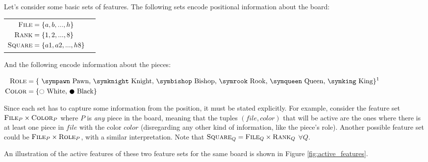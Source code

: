 Let's consider some basic sets of features. The following sets encode positional information about the board:

\begin{center}
\begin{tabular}{cc}

$\begin{aligned}[t]
\textsc{File} &= \{a, b, ..., h\} \\
\textsc{Rank} &= \{1, 2, ..., 8\} \\
\textsc{Square} &= \{a1, a2, ..., h8\}
\end{aligned}$

&

\raisebox{-10ex}{
\chessboard[
    tinyboard,
    showmover=false,
    pgfstyle={text},
    text=\fontsize{1.2ex}{1.2ex}\bfseries\sffamily \currentwq,
    markboard
]
}

\end{tabular}
\end{center}

And the following encode information about the pieces:

\begin{center}
$\begin{aligned}[t]
\featureset{Role} &= \text{\{
    \sympawn\ Pawn,
    \symknight\ Knight,
    \symbishop\ Bishop,
    \symrook\ Rook,
    \symqueen\ Queen,
    \symking\ King\}}\textsuperscript{1} \\
\featureset{Color} &= \text{\{\white\ White, \black\ Black\}}
\end{aligned}$
\end{center}

Since each set has to capture some information from the position, it must be stated explicitly. For example, consider the feature set $\textsc{File}_{P} \times \textsc{Color}_{P}$ where $P$ is \textit{any} piece in the board, meaning that the tuples $(file, color)$ that will be active are the ones where there is at least one piece in $file$ with the color $color$ (disregarding any other kind of information, like the piece's role). Another possible feature set could be $\textsc{File}_{P} \times \textsc{Role}_{P}$, with a similar interpretation. Note that $\textsc{Square}_Q = \textsc{File}_Q \times \textsc{Rank}_Q$ $\forall Q$.

An illustration of the active features of these two feature sets for the same board is shown in Figure \ref{fig:active_features}.

